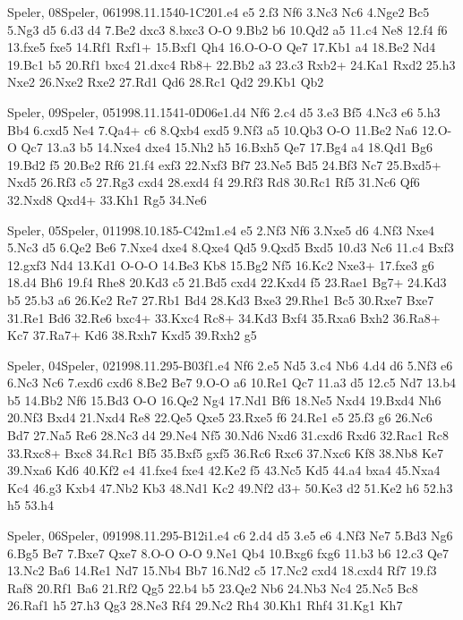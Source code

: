 \documentclass[twocolumn,a4paper,10pt]{report}
\begin{document}
\begin{chessgame}{Speler, 08}{Speler, 06}{1998.11.15}{4}{0-1}{C20}{1.e4 e5 2.f3 Nf6 3.Nc3 Nc6 4.Nge2 Bc5 5.Ng3 d5 6.d3 d4 7.Be2 dxc3 8.bxc3 O-O 9.Bb2 b6 10.Qd2 a5 11.c4 Ne8 12.f4 f6 13.fxe5 fxe5 14.Rf1 Rxf1+ 15.Bxf1 Qh4 16.O-O-O Qe7 17.Kb1 a4 18.Be2 Nd4 19.Bc1 b5 20.Rf1 bxc4 21.dxc4 Rb8+ 22.Bb2 a3 23.c3 Rxb2+ 24.Ka1 Rxd2 25.h3 Nxe2 26.Nxe2 Rxe2 27.Rd1 Qd6 28.Rc1 Qd2 29.Kb1 Qb2\mate}\end{chessgame}
\begin{chessgame}{Speler, 09}{Speler, 05}{1998.11.15}{4}{1-0}{D06e}{1.d4 Nf6 2.c4 d5 3.e3 Bf5 4.Nc3 e6 5.h3 Bb4 6.cxd5 Ne4 7.Qa4+ c6 8.Qxb4 exd5 9.Nf3 a5 10.Qb3 O-O 11.Be2 Na6 12.O-O Qc7 13.a3 b5 14.Nxe4 dxe4 15.Nh2 h5 16.Bxh5 Qe7 17.Bg4 a4 18.Qd1 Bg6 19.Bd2 f5 20.Be2 Rf6 21.f4 exf3 22.Nxf3 Bf7 23.Ne5 Bd5 24.Bf3 Nc7 25.Bxd5+ Nxd5 26.Rf3 c5 27.Rg3 cxd4 28.exd4 f4 29.Rf3 Rd8 30.Rc1 Rf5 31.Nc6 Qf6 32.Nxd8 Qxd4+ 33.Kh1 Rg5 34.Ne6}\end{chessgame}
\begin{chessgame}{Speler, 05}{Speler, 01}{1998.10.18}{5}{\textonehalf-\textonehalf}{C42m}{1.e4 e5 2.Nf3 Nf6 3.Nxe5 d6 4.Nf3 Nxe4 5.Nc3 d5 6.Qe2 Be6 7.Nxe4 dxe4 8.Qxe4 Qd5 9.Qxd5 Bxd5 10.d3 Nc6 11.c4 Bxf3 12.gxf3 Nd4 13.Kd1 O-O-O 14.Be3 Kb8 15.Bg2 Nf5 16.Kc2 Nxe3+ 17.fxe3 g6 18.d4 Bh6 19.f4 Rhe8 20.Kd3 c5 21.Bd5 cxd4 22.Kxd4 f5 23.Rae1 Bg7+ 24.Kd3 b5 25.b3 a6 26.Ke2 Re7 27.Rb1 Bd4 28.Kd3 Bxe3 29.Rhe1 Bc5 30.Rxe7 Bxe7 31.Re1 Bd6 32.Re6 bxc4+ 33.Kxc4 Rc8+ 34.Kd3 Bxf4 35.Rxa6 Bxh2 36.Ra8+ Kc7 37.Ra7+ Kd6 38.Rxh7 Kxd5 39.Rxh2 g5}\end{chessgame}
\begin{chessgame}{Speler, 04}{Speler, 02}{1998.11.29}{5}{\textonehalf-\textonehalf}{B03f}{1.e4 Nf6 2.e5 Nd5 3.c4 Nb6 4.d4 d6 5.Nf3 e6 6.Nc3 Nc6 7.exd6 cxd6 8.Be2 Be7 9.O-O a6 10.Re1 Qc7 11.a3 d5 12.c5 Nd7 13.b4 b5 14.Bb2 Nf6 15.Bd3 O-O 16.Qe2 Ng4 17.Nd1 Bf6 18.Ne5 Nxd4 19.Bxd4 Nh6 20.Nf3 Bxd4 21.Nxd4 Re8 22.Qe5 Qxe5 23.Rxe5 f6 24.Re1 e5 25.f3 g6 26.Nc6 Bd7 27.Na5 Re6 28.Nc3 d4 29.Ne4 Nf5 30.Nd6 Nxd6 31.cxd6 Rxd6 32.Rac1 Rc8 33.Rxc8+ Bxc8 34.Rc1 Bf5 35.Bxf5 gxf5 36.Rc6 Rxc6 37.Nxc6 Kf8 38.Nb8 Ke7 39.Nxa6 Kd6 40.Kf2 e4 41.fxe4 fxe4 42.Ke2 f5 43.Nc5 Kd5 44.a4 bxa4 45.Nxa4 Kc4 46.g3 Kxb4 47.Nb2 Kb3 48.Nd1 Kc2 49.Nf2 d3+ 50.Ke3 d2 51.Ke2 h6 52.h3 h5 53.h4}\end{chessgame}
\begin{chessgame}{Speler, 06}{Speler, 09}{1998.11.29}{5}{\textonehalf-\textonehalf}{B12i}{1.e4 c6 2.d4 d5 3.e5 e6 4.Nf3 Ne7 5.Bd3 Ng6 6.Bg5 Be7 7.Bxe7 Qxe7 8.O-O O-O 9.Ne1 Qb4 10.Bxg6 fxg6 11.b3 b6 12.c3 Qe7 13.Nc2 Ba6 14.Re1 Nd7 15.Nb4 Bb7 16.Nd2 c5 17.Nc2 cxd4 18.cxd4 Rf7 19.f3 Raf8 20.Rf1 Ba6 21.Rf2 Qg5 22.b4 b5 23.Qe2 Nb6 24.Nb3 Nc4 25.Nc5 Bc8 26.Raf1 h5 27.h3 Qg3 28.Ne3 Rf4 29.Nc2 Rh4 30.Kh1 Rhf4 31.Kg1 Kh7}\end{chessgame}
\end{document}
